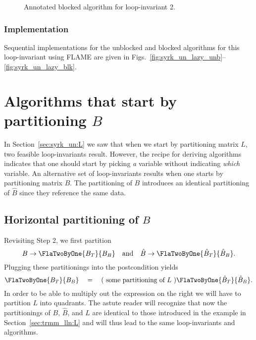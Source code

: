 \renewcommand{\update}{
\begin{minipage}[t]{4in}
\noindent
$ B_1 \becomes L_{10} B_0 + L_{11} B_1 $\\
\end{minipage}
}

\begin{figure}[htbp]
\worksheet
\caption{Annotated blocked algorithm for loop-invariant 2.}
\label{fig:ws:ltrmm_lln:var2:blk}
\end{figure}
%

\subsubsection{Implementation}

Sequential implementations for the unblocked and blocked algorithms
for this loop-invariant using FLAME are given in
Figs.~\ref{fig:syrk_un_lazy_unb}--\ref{fig:syrk_un_lazy_blk}.

\section{Algorithms that start by partitioning $ B $}

In Section~\ref{sec:syrk_un:L} we saw that when we start by
partitioning matrix $ L $, two feasible loop-invariants result.
However, the recipe for deriving algorithms indicates that one should
start by picking {\em a} variable without indicating {\em which}
variable.  An alternative set of loop-invariants results when one
starts by partitioning matrix $ B $.  The partitioning of $ B $
introduces an identical partitioning of $ \hat{B} $ since they
reference the same data.

\subsection{Horizontal partitioning of $ B$}

Revisiting Step 2, we first partition
\[
B \rightarrow \FlaTwoByOne{ B_{T}}{ B_{B} }
\quad
\mbox{and}
\quad
\hat{B} \rightarrow \FlaTwoByOne{ \hat{B}_{T}}{ \hat{B}_{B} }.
\]
Plugging these partitionings into the postcondition yields
\[
\FlaTwoByOne{ B_{T}}{ B_{B} }
\quad
=
\quad
( \mbox{ some partitioning of $ L $ } )
\FlaTwoByOne{ \hat{B}_{T}}{ \hat{B}_{B} }.
\]
In order to be able to multiply out the expression on the right we
will have to partition $ L $ into quadrants.  The astute reader will
recognize that now the partitionings of $ B $, $ \hat{B} $, and $ L $
are identical to those introduced in the example in
Section~\ref{sec:trmm_lln:L} and will thus lead to the same
loop-invariants and algorithms.

